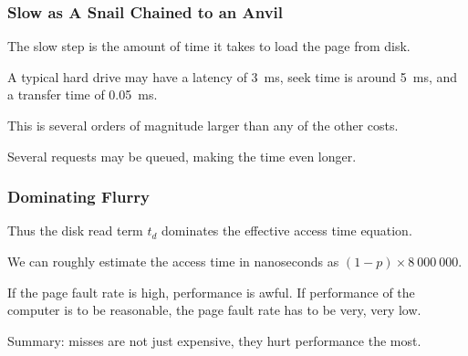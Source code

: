 \begin{frame}
\frametitle{Slow as A Snail Chained to an Anvil}

The slow step is the amount of time it takes to load the page from disk. 

A typical hard drive may have a latency of 3~ms, seek time is around 5~ms, and a transfer time of 0.05~ms. 

This is  several orders of magnitude larger than any of the other costs.

Several requests may be queued, making the time even longer.

\end{frame}



\begin{frame}
\frametitle{Dominating Flurry}


Thus the disk read term $t_{d}$ dominates the effective access time equation. 

We can roughly estimate the access time in nanoseconds as $(1-p) \times 8~000~000$. 

If the page fault rate is high, performance is awful. If performance of the computer is to be reasonable, the page fault rate has to be very, very low. 


Summary: misses are not just expensive, they hurt performance the most.

\end{frame}





